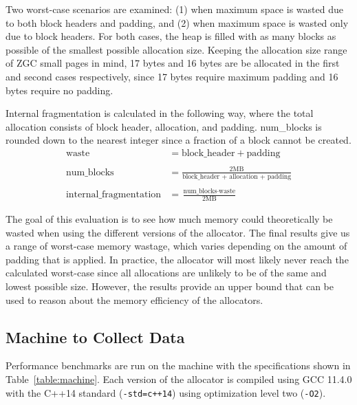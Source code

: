 Two worst-case scenarios are examined: (1) when maximum space is wasted due to both block headers and padding, and (2) when maximum space is wasted only due to block headers. For both cases, the heap is filled with as many blocks as possible of the smallest possible allocation size. Keeping the allocation size range of ZGC small pages in mind, 17 bytes and 16 bytes are be allocated in the first and second cases respectively, since 17 bytes require maximum padding and 16 bytes require no padding.

Internal fragmentation is calculated in the following way, where the total allocation consists of block header, allocation, and padding. num\_blocks is rounded down to the nearest integer since a fraction of a block cannot be created.
\begin{align*}
    \text{waste} &= \text{block\_header} + \text{padding} \\\\
    \text{num\_blocks} &= \frac{2\text{MB}}{\text{block\_header + allocation + padding}} \\\\
    \text{internal\_fragmentation} &= \frac{\text{num\_blocks} \cdot \text{waste}}{2\text{MB}}
\end{align*}

The goal of this evaluation is to see how much memory could theoretically be wasted when using the different versions of the allocator. The final results give us a range of worst-case memory wastage, which varies depending on the amount of padding that is applied. In practice, the allocator will most likely never reach the calculated worst-case since all allocations are unlikely to be of the same and lowest possible size. However, the results provide an upper bound that can be used to reason about the memory efficiency of the allocators.

\subsection{Machine to Collect Data}

Performance benchmarks are run on the machine with the specifications shown in Table~\ref{table:machine}. Each version of the allocator is compiled using GCC 11.4.0 with the C++14 standard (\texttt{-std=c++14}) using optimization level two (\texttt{-O2}).

